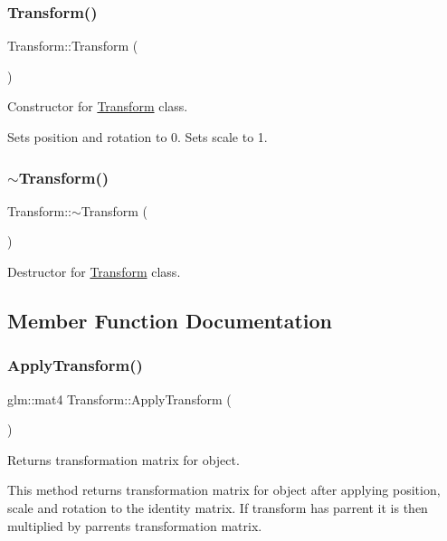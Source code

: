\subsubsection{\texorpdfstring{Transform()}{Transform()}}
{\footnotesize\ttfamily Transform\+::\+Transform (\begin{DoxyParamCaption}{ }\end{DoxyParamCaption})}



Constructor for \mbox{\hyperlink{class_transform}{Transform}} class. 

Sets position and rotation to 0. Sets scale to 1. \mbox{\label{class_transform_aa72e286c069850db80927b0e6554cd3e}} 
\subsubsection{\texorpdfstring{$\sim$Transform()}{~Transform()}}
{\footnotesize\ttfamily Transform\+::$\sim$\+Transform (\begin{DoxyParamCaption}{ }\end{DoxyParamCaption})}



Destructor for \mbox{\hyperlink{class_transform}{Transform}} class. 



\subsection{Member Function Documentation}
\mbox{\label{class_transform_a550c9c8417c6d288e6352d6cc424a0e9}} 
\subsubsection{\texorpdfstring{ApplyTransform()}{ApplyTransform()}}
{\footnotesize\ttfamily glm\+::mat4 Transform\+::\+Apply\+Transform (\begin{DoxyParamCaption}{ }\end{DoxyParamCaption})}



Returns transformation matrix for object. 

This method returns transformation matrix for object after applying position, scale and rotation to the identity matrix. If transform has parrent it is then multiplied by parrent\textquotesingle{}s transformation matrix. \mbox{\label{class_transform_a5486927ebcb043b7347644041024f47c}} 
